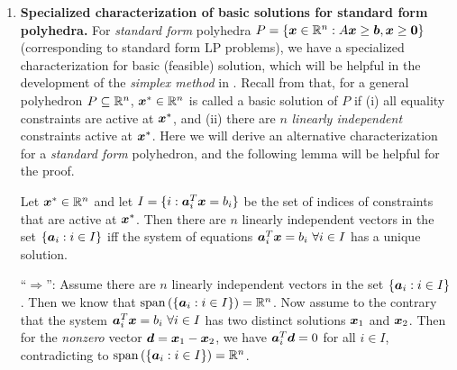 \begin{enumerate}
\item \textbf{Specialized characterization of basic solutions for standard form
polyhedra.} For \emph{standard form} polyhedra
\(P=\{\bm{x}\in\mathbb{R}^n:A\bm{x}\ge\bm{b},\bm{x}\ge\bm{0}\}\)
(corresponding to standard form LP problems), we have a specialized
characterization for basic (feasible) solution, which will be helpful in the
development of the \emph{simplex method} in .
Recall from  that, for a general polyhedron \(P\subseteq
\mathbb{R}^n\), \(\bm{x}^*\in\mathbb{R}^n\) is called a basic solution of \(P\) if (i) all equality
constraints are active at \(\bm{x}^*\), and (ii) there are \(n\) \emph{linearly
independent} constraints active at \(\bm{x}^*\). Here we will derive
an alternative characterization for a \emph{standard form} polyhedron, and the
following lemma will be helpful for the proof.
\begin{lemma}
\label{lma:n-li-active-iff-unique-sol}
Let \(\bm{x}^*\in\mathbb{R}^n\) and let \(I=\{i:\bm{a}_i^{T}\bm{x}=b_i\}\) be the
set of indices of constraints that are active at \(\bm{x}^*\).  Then there
are \(n\) linearly independent vectors in the set \(\{\bm{a}_i:i\in I\}\) iff
the system of equations \(\bm{a}_i^{T}\bm{x}=b_i~\forall i\in I\) has a
unique solution.
\end{lemma}
\begin{pf}
``\(\Rightarrow\)'': Assume there are \(n\) linearly independent vectors in the
set \(\{\bm{a}_i:i\in I\}\). Then we know that \(\operatorname{span}\left(\{\bm{a}_i:i\in
I\}\right)=\mathbb{R}^n\). Now assume to the contrary that the system
\(\bm{a}_i^{T}\bm{x}=b_i~\forall i\in I\) has two distinct solutions
\(\bm{x}_{1}\) and \(\bm{x}_{2}\). Then for the \emph{nonzero} vector
\(\bm{d}=\bm{x}_1-\bm{x}_2\), we have \(\bm{a}_i^{T}\bm{d}=0\) for
all \(i\in I\), contradicting to \(\operatorname{span}\left(\{\bm{a}_i:i\in I\}\right)=\mathbb{R}^n\).


\end{pf}
\end{enumerate}
